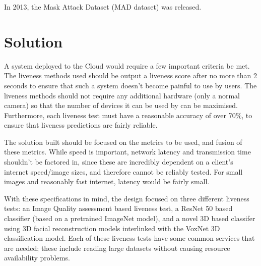 \documentclass[10pt,a4paper]{article}
\begin{document}
        In 2013, the Mask Attack Dataset (MAD dataset) was released. \cite{3DMadDataset}



\section{Solution}

    A system deployed to the Cloud would require a few important criteria be met. The liveness methods used should be output a liveness score after no more than 2 seconds
    to ensure that such a system doesn't become painful to use by users. The liveness methods should not require any additional hardware (only a normal camera) so that the number
    of devices it can be used by can be maximised. Furthermore, each liveness test must have a reasonable accuracy of over 70\%, to ensure that liveness predictions are fairly reliable.

    The solution built should be focused on the metrics to be used, and fusion of these metrics. While speed is important, network latency and transmission time shouldn't be factored in, 
    since these are incredibly dependent on a client's internet speed/image sizes, and therefore cannot be reliably tested. For small images and reasonably fast internet, latency would be fairly small.

    With these specifications in mind, the design focused on three different liveness tests: an Image Quality assessment based liveness test, a ResNet 50 based classifier (based on a pretrained ImageNet model),
    and a novel 3D based classifer using 3D facial reconstruction models interlinked with the VoxNet 3D classification model. Each of these liveness tests have some common services that are needed; these include
    reading large datasets without causing resource availability problems.
\end{document}
